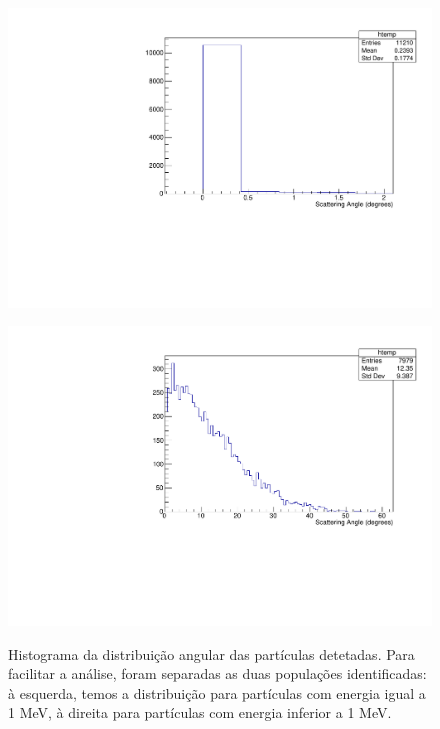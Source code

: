 \documentclass[a4paper, 12pt]{article} %
\begin{document}
	\begin{figure}[H]
		\centering
		\begin{minipage}{0.45\linewidth}
			\includegraphics[width=\linewidth]{dist_pop_angle_1mev.pdf}
			\label{fig:angle_dist_inf1mev}
		\end{minipage}
		\begin{minipage}{0.45\linewidth}
			\centering
			\includegraphics[width=\linewidth]{dist_pop_angle.pdf}
			\label{fig:angle_dist_1mev}
		\end{minipage}

		\caption{Histograma da distribuição angular das partículas detetadas. Para facilitar a análise, foram separadas as duas populações identificadas: à esquerda, temos a distribuição para partículas com energia igual a 1 MeV, à direita para partículas com energia inferior a 1 MeV.}
		\label{fig:angular_dist}
	\end{figure}
\end{document}
